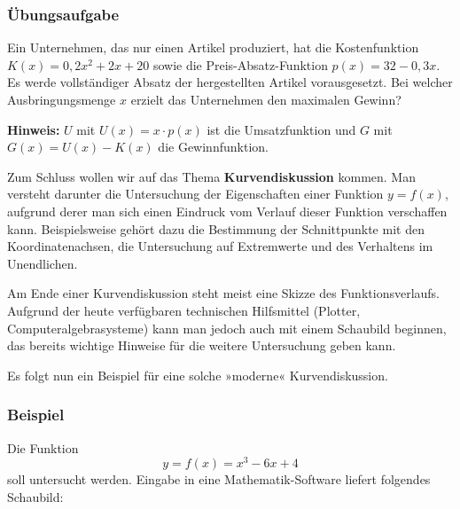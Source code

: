 \subsubsection{Übungsaufgabe}

\begin{graukasten}
  Ein Unternehmen, das nur einen Artikel produziert, hat die Kostenfunktion $K(x) = 0{,}2x^2 + 2x + 20$ sowie die Preis-Absatz-Funktion $p(x) = 32 - 0{,}3x$. Es werde vollständiger Absatz der hergestellten Artikel vorausgesetzt. Bei welcher Ausbringungsmenge $x$ erzielt das Unternehmen den maximalen Gewinn?

  \textbf{Hinweis:} $U$ mit $U(x) = x \cdot p(x)$ ist die Umsatzfunktion und $G$ mit $G(x) = U(x) - K(x)$ die Gewinnfunktion.
\end{graukasten}

Zum Schluss wollen wir auf das Thema \textbf{Kurvendiskussion} kommen. Man versteht darunter die Untersuchung der Eigenschaften einer Funktion $y = f(x)$, aufgrund derer man sich einen Eindruck vom Verlauf dieser Funktion verschaffen kann. Beispielsweise gehört dazu die Bestimmung der Schnittpunkte mit den Koordinatenachsen, die Untersuchung auf Extremwerte und des Verhaltens im Unendlichen.

Am Ende einer Kurvendiskussion steht meist eine Skizze des Funktionsverlaufs. Aufgrund der heute verfügbaren technischen Hilfsmittel (Plotter, Computeralgebrasysteme) kann man jedoch auch mit einem Schaubild beginnen, das bereits wichtige Hinweise für die weitere Untersuchung geben kann.

Es folgt nun ein Beispiel für eine solche »moderne« Kurvendiskussion.

\subsubsection{Beispiel}

Die Funktion
\[ y = f(x) = x^3 - 6x + 4 \]
soll untersucht werden. Eingabe in eine Mathematik-Software liefert folgendes Schaubild:

\begin{center}
\end{center}

